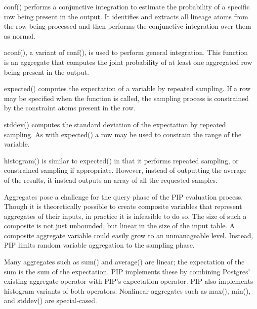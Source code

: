 conf() performs a conjunctive integration to estimate the probability of a specific row being present in the output.  It identifies and extracts all lineage atoms from the row being processed and then performs the conjunctive integration over them as normal.

aconf(), a variant of conf(), is used to perform general integration.  This function is an aggregate that computes the joint probability of at least one aggregated row being present in the output.  

expected() computes the expectation of a variable by repeated sampling.  If a row may be specified when the function is called, the sampling process is constrained by the constraint atoms present in the row.

stddev() computes the standard deviation of the expectation by repeated sampling.  As with expected() a row may be used to constrain the range of the variable.

histogram() is similar to expected() in that it performs repeated sampling, or constrained sampling if appropriate.  However, instead of outputting the average of the results, it instead outputs an array of all the requested samples.

Aggregates pose a challenge for the query phase of the PIP evaluation process.  Though it is theoretically possible to create composite variables that represent aggregates of their inputs, in practice it is infeasible to do so.  The size of such a composite is not just unbounded, but linear in the size of the input table.  A composite aggregate variable could easily grow to an unmanageable level.  Instead, PIP limits random variable aggregation to the sampling phase.  

Many aggregates such as sum() and average() are linear; the expectation of the sum is the sum of the expectation.  PIP implements these by combining Postgres' existing aggregate operator with PIP's expectation operator.  PIP also implements histogram variants of both operators.  Nonlinear aggregates such as max(), min(), and stddev() are special-cased.  

